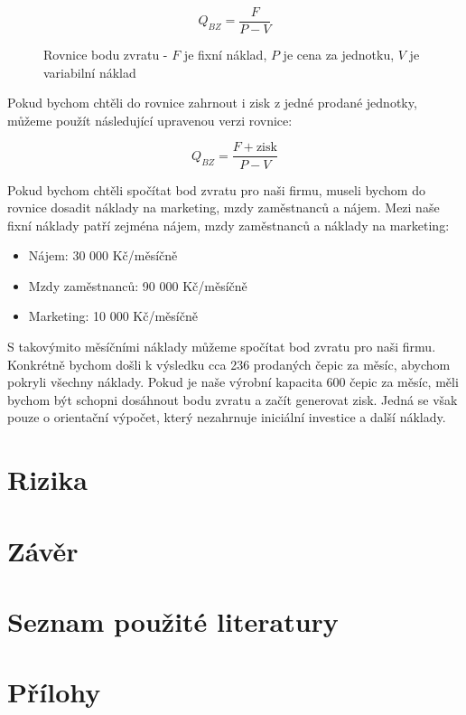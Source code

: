 \documentclass[12pt, a4paper]{article}
\begin{document}
\begin{figure}[h]
  \centering
  \captionsetup{justification=centering}
  \begin{equation}
    Q_{BZ}=\frac{F}{P-V}
  \end{equation}
  \caption{Rovnice bodu zvratu - $F$ je fixní náklad, $P$ je cena za jednotku, $V$ je variabilní náklad}
\end{figure}

\noindent Pokud bychom chtěli do rovnice zahrnout i zisk z jedné prodané jednotky, můžeme použít následující upravenou verzi rovnice:

\begin{figure}[h]
  \centering
  \captionsetup{justification=centering}
  \begin{equation}
    Q_{BZ}=\frac{F+\text{zisk}}{P-V}
  \end{equation}
\end{figure}

\noindent Pokud bychom chtěli spočítat bod zvratu pro naši firmu, museli bychom do rovnice dosadit náklady na marketing, mzdy zaměstnanců a nájem.
Mezi naše fixní náklady patří zejména nájem, mzdy zaměstnanců a náklady na marketing:
\begin{itemize}
  \item Nájem: 30 000 Kč/měsíčně
  \item Mzdy zaměstnanců: 90 000 Kč/měsíčně
  \item Marketing: 10 000 Kč/měsíčně
\end{itemize}

S takovýmito měsíčními náklady můžeme spočítat bod zvratu pro naši firmu.
Konkrétně bychom došli k výsledku cca 236 prodaných čepic za měsíc, abychom pokryli všechny náklady.
Pokud je naše výrobní kapacita 600 čepic za měsíc, měli bychom být schopni dosáhnout bodu zvratu a začít generovat zisk.
Jedná se však pouze o orientační výpočet, který nezahrnuje iniciální investice a další náklady.

\section{Rizika}
\section{Závěr}
\section{Seznam použité literatury}
\printbibliography[heading=none]
\section{Přílohy}

\listoftables
\end{document}
